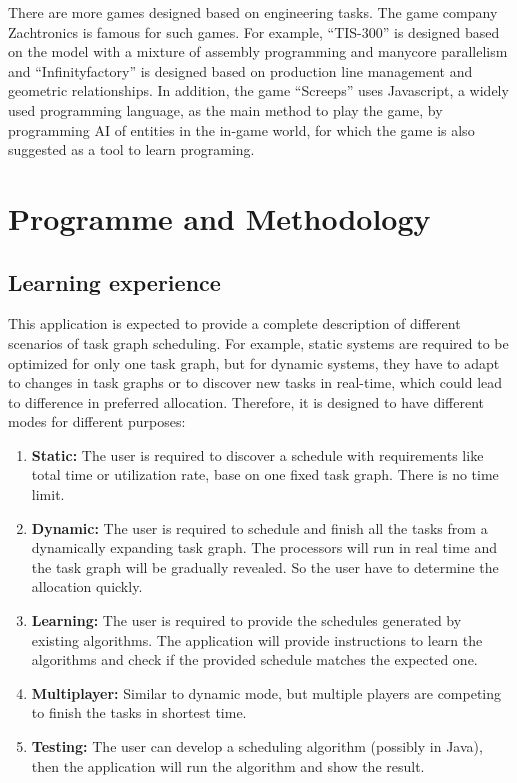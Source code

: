 \documentclass[a4paper,11pt]{article}
\begin{document}
There are more games designed based on engineering tasks. The game company Zachtronics is famous for such games. For example, ``TIS-300'' is designed based on the model with a mixture of assembly programming and manycore parallelism and ``Infinityfactory'' is designed based on production line management and geometric relationships. In addition, the game ``Screeps'' uses Javascript, a widely used programming language, as the main method to play the game, by programming AI of entities in the in-game world, for which the game is also suggested as a tool to learn programing.

\section{Programme and Methodology}

\subsection{Learning experience} \label{sec:modes}

This application is expected to provide a complete description of different scenarios of task graph scheduling. For example, static systems are required to be optimized for only one task graph, but for dynamic systems, they have to adapt to changes in task graphs or to discover new tasks in real-time, which could lead to difference in preferred allocation. Therefore, it is designed to have different modes for different purposes:

\begin{enumerate}
    \item \textbf{Static:} The user is required to discover a schedule with requirements like total time or utilization rate, base on one fixed task graph. There is no time limit.
    \item \textbf{Dynamic:} The user is required to schedule and finish all the tasks from a dynamically expanding task graph. The processors will run in real time and the task graph will be gradually revealed. So the user have to determine the allocation quickly.
    \item \textbf{Learning:} The user is required to provide the schedules generated by existing algorithms. The application will provide instructions to learn the algorithms and check if the provided schedule matches the expected one.
    \item \textbf{Multiplayer:} Similar to dynamic mode, but multiple players are competing to finish the tasks in shortest time.
    \item \textbf{Testing:} The user can develop a scheduling algorithm (possibly in Java), then the application will run the algorithm and show the result.
\end{enumerate}
\end{document}
